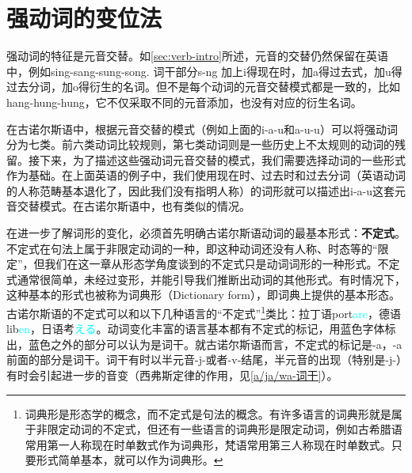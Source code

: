 \section{强动词的变位法}
强动词的特征是元音交替。如\ref{sec:verb-intro}所述，元音的交替仍然保留在英语中，例如sing-sang-sung-song. 词干部分s-ng 加上i得现在时，加a得过去式，加u得过去分词，加o得衍生的名词。但不是每个动词的元音交替模式都是一致的，比如hang-hung-hung，它不仅采取不同的元音添加，也没有对应的衍生名词。

在古诺尔斯语中，根据元音交替的模式（例如上面的i-a-u和a-u-u）可以将强动词分为七类。前六类动词比较规则，第七类动词则是一些历史上不太规则的动词的残留。接下来，为了描述这些强动词元音交替的模式，我们需要选择动词的一些形式作为基础。在上面英语的例子中，我们使用现在时、过去时和过去分词（英语动词的人称范畴基本退化了，因此我们没有指明人称）的词形就可以描述出i-a-u这套元音交替模式。在古诺尔斯语中，也有类似的情况。

在进一步了解词形的变化，必须首先明确古诺尔斯语动词的最基本形式：\textbf{不定式}。不定式在句法上属于非限定动词的一种，即这种动词还没有人称、时态等的“限定”，但我们在这一章从形态学角度谈到的不定式只是动词词形的一种形式。不定式通常很简单，未经过变形，并能引导我们推断出动词的其他形式。有时情况下，这种基本的形式也被称为词典形（Dictionary form），即词典上提供的基本形态。古诺尔斯语的不定式可以和以下几种语言的``不定式''\footnote{词典形是形态学的概念，而不定式是句法的概念。有许多语言的词典形就是属于非限定动词的不定式，但还有一些语言的词典形是限定动词，例如古希腊语常用第一人称现在时单数式作为词典形，梵语常用第三人称现在时单数式。只要形式简单基本，就可以作为词典形。}类比：拉丁语port\textcolor{cyan}{are}，德语lib\textcolor{cyan}{en}，日语考\textcolor{cyan}{える}。动词变化丰富的语言基本都有不定式的标记，用蓝色字体标出，蓝色之外的部分可以认为是词干。就古诺尔斯语而言，不定式的标记是-a，-a前面的部分是词干。词干有时以半元音-j-或者-v-结尾，半元音的出现（特别是-j-）有时会引起进一步的音变（西弗斯定律的作用，见\ref{a/ja/wa-词干}）。


